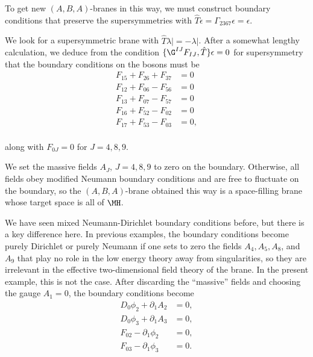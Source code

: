 To get new $(A,B,A)$-branes in this way, we must construct
boundary conditions that preserve the supersymmetries with $\hat
T\epsilon=\Gamma_{2367}\epsilon=\epsilon$.

We look for a supersymmetric brane with $\hat
T\lambda|=-\lambda|$. After a somewhat lengthy calculation, we
deduce from the condition $\{\G^{IJ}F_{IJ},\hat T\}\epsilon=0$ for
supersymmetry that the boundary conditions on the bosons must be
\setcounter{equation}{30}
\begin{equation}\label{eq:tomgo}
\begin{aligned}F_{15}+F_{26}+F_{37}& = 0 \\
                    F_{12}+F_{06}-F_{56}& = 0 \\
                    F_{13}+F_{07}-F_{57}& = 0 \\
                    F_{16}+F_{52}-F_{02}& = 0 \\
                    F_{17}+F_{53}-F_{03}& = 0 ,\\\end{aligned}
\end{equation}

along with $F_{0J}=0$ for $J=4,8,9$.

We set the massive fields $A_J,\,J=4,8,9$ to zero on the boundary.
Otherwise, all fields obey modified Neumann boundary conditions
and are free to fluctuate on the boundary, so the $(A,B,A)$-brane
obtained this way is a space-filling brane whose target space is
all of $\MH$.

We have seen mixed Neumann-Dirichlet boundary conditions before,
but there is a key difference here. In previous examples, the
boundary conditions become purely Dirichlet or purely Neumann if
one sets to zero the fields $A_4,A_5,A_8$, and $A_9$ that play no
role in the low energy theory away from singularities, so they are
irrelevant in the effective two-dimensional field theory of the
brane.  In the present example, this is not the case. After
discarding the ``massive'' fields and choosing the gauge $A_1=0$,
the boundary conditions become %
\setcounter{equation}{31}
\begin{equation}\label{eq:bdrycc}
\begin{aligned}
D_0\phi_2+\partial_1 A_2&=0,\\ D_0\phi_3+\partial_1 A_3&=0,\\
F_{02}-\partial_1\phi_2&=0,\\ F_{03}-\partial_1\phi_3&=0.\end{aligned}
\end{equation}

